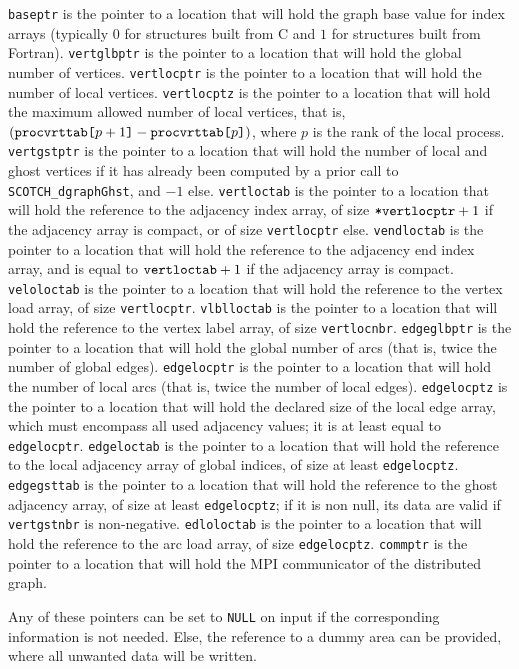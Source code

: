 \begin{itemize}
{\tt baseptr} is the pointer to a location that will hold the graph base
value for index arrays (typically $0$ for
structures built from C and $1$ for structures built from Fortran).
{\tt vertglbptr} is the pointer to a location that will hold the
global number of vertices.
{\tt vertlocptr} is the pointer to a location that will hold the
number of local vertices.
{\tt vertlocptz} is the pointer to a location that will hold the
maximum allowed number of local vertices, that is,
$(\mbox{\tt proc\lbt vrt\lbt tab[}p + 1\mbox{\tt]} -
\mbox{\tt proc\lbt vrt\lbt tab[}p\mbox{\tt]})$, where $p$ is the
rank of the local process.
{\tt vertgstptr} is the pointer to a location that will hold the
number of local and ghost vertices if it has already been computed
by a prior call to {\tt SCOTCH\_\lbt dgraph\lbo Ghst}, and $-1$
else. {\tt vertloctab} is the pointer to a location that will hold the
reference to the adjacency index array, of size
$\mbox{\tt *vertlocptr} + 1$ if the adjacency array is compact,
or of size {\tt *vertlocptr} else.
{\tt vendloctab} is the pointer to a location that will hold the
reference to the adjacency end index array, and is equal to
$\mbox{\tt vertloctab} + 1$ if the adjacency array is compact.
{\tt veloloctab} is the pointer to a location that will hold the
reference to the vertex load array, of size {\tt *vertlocptr}.
{\tt vlblloctab} is the pointer to a location that will hold the
reference to the vertex label array, of size {\tt vertlocnbr}.
{\tt edgeglbptr} is the pointer to a location that will hold the
global number of arcs (that is, twice the number of global edges).
{\tt edgelocptr} is the pointer to a location that will hold the
number of local arcs (that is, twice the number of local edges).
{\tt edgelocptz} is the pointer to a location that will hold the
declared size of the local edge array, which must encompass all
used adjacency values; it is at least equal to {\tt *edgelocptr}.
{\tt edgeloctab} is the pointer to a location that will hold the
reference to the local adjacency array of global indices, of size
at least {\tt *edgelocptz}.
{\tt edgegsttab} is the pointer to a location that will hold the
reference to the ghost adjacency array, of size at least
{\tt *edgelocptz}; if it is non null, its data are valid if
{\tt vertgstnbr} is non-negative.
{\tt edloloctab} is the pointer to a location that will hold the
reference to the arc load array, of size {\tt *edgelocptz}.
{\tt commptr} is the pointer to a location that will hold the MPI
communicator of the distributed graph.

Any of these pointers can be set to {\tt NULL} on input if the
corresponding information is not needed. Else, the reference to a
dummy area can be provided, where all unwanted data will be written.


\end{itemize}

